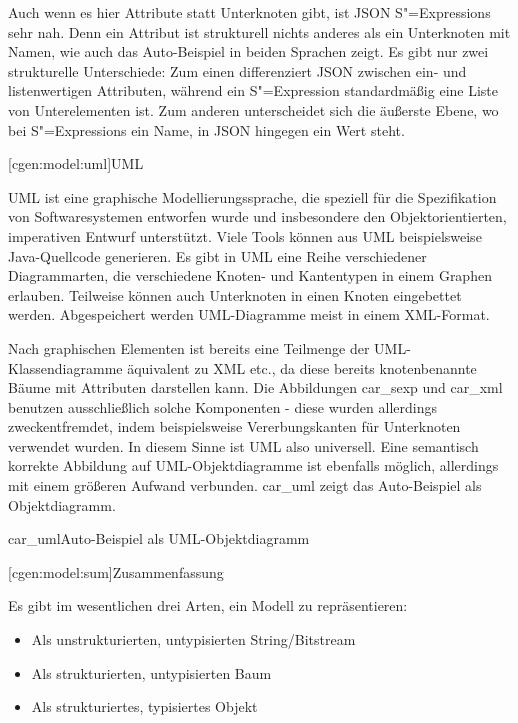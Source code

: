 \documentclass[a4paper, bibgerm]{book}
\newcommand\lsubsection{}
\newcommand\fref{}
\newcommand\abb{}
\newcommand\fig{}
\newcommand{\sexp}{S"=Expression}
\newcommand{\sexps}{S"=Expressions}
\begin{document}
Auch wenn es hier Attribute statt Unterknoten gibt, ist JSON \sexps{}
sehr nah. Denn ein Attribut ist strukturell nichts anderes als ein
Unterknoten mit Namen, wie auch das Auto-Beispiel in beiden Sprachen
zeigt. Es gibt nur zwei strukturelle Unterschiede: Zum einen
differenziert JSON zwischen ein- und listenwertigen Attributen, während
ein \sexp{} standardmäßig eine Liste von Unterelementen ist. Zum anderen
unterscheidet sich die äußerste Ebene, wo bei \sexps{} ein Name, in JSON
hingegen ein Wert steht.

\lsubsection[cgen:model:uml]{UML}

UML ist eine graphische Modellierungssprache, die speziell für die
Spezifikation von Softwaresystemen entworfen wurde und insbesondere den
Objektorientierten, imperativen Entwurf unterstützt. Viele Tools können
aus UML beispielsweise Java-Quellcode generieren. Es gibt in UML eine
Reihe verschiedener Diagrammarten, die verschiedene Knoten- und
Kantentypen in einem Graphen erlauben. Teilweise können auch Unterknoten
in einen Knoten eingebettet werden. Abgespeichert werden UML-Diagramme
meist in einem XML-Format.

Nach graphischen Elementen ist bereits eine Teilmenge der
UML-Klassen\-diagramme äquivalent zu XML etc., da diese bereits
knotenbenannte Bäume mit Attributen darstellen kann. Die Abbildungen
\fref{car_sexp} und \fref{car_xml} benutzen ausschließlich solche
Komponenten - diese wurden allerdings zweckentfremdet, indem
beispielsweise Vererbungskanten für Unterknoten verwendet wurden. In
diesem Sinne ist UML also universell. Eine semantisch korrekte Abbildung
auf UML-Objektdiagramme ist ebenfalls möglich, allerdings mit einem
größeren Aufwand verbunden. \abb{car_uml} zeigt das Auto-Beispiel als
Objektdiagramm.

\fig{car_uml}{Auto-Beispiel als UML-Objektdiagramm}

\lsubsection[cgen:model:sum]{Zusammenfassung}

Es gibt im wesentlichen drei Arten, ein Modell zu repräsentieren:
\begin{itemize}
\item Als unstrukturierten, untypisierten String/Bitstream
\item Als strukturierten, untypisierten Baum
\item Als strukturiertes, typisiertes Objekt
\end{itemize}
\end{document}

